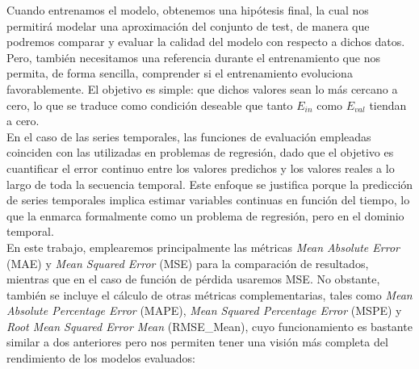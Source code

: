 Cuando entrenamos el modelo, obtenemos una hipótesis final, la cual nos permitirá modelar una aproximación del conjunto de test, de manera que podremos comparar y evaluar la calidad del modelo con respecto a dichos datos. Pero, también necesitamos una referencia durante el entrenamiento que nos permita, de forma sencilla, comprender si el entrenamiento evoluciona favorablemente. El objetivo es simple: que dichos valores sean lo más cercano a cero, lo que se traduce como condición deseable que tanto $E_{in}$ como $E_{val}$ tiendan a cero.\\

En el caso de las series temporales, las funciones de evaluación empleadas coinciden con las utilizadas en problemas de regresión, dado que el objetivo es cuantificar el error continuo entre los valores predichos y los valores reales a lo largo de toda la secuencia temporal. Este enfoque se justifica porque la predicción de series temporales implica estimar variables continuas en función del tiempo, lo que la enmarca formalmente como un problema de regresión, pero en el dominio temporal.\\

En este trabajo, emplearemos principalmente las métricas \textit{Mean Absolute Error} (MAE) y \textit{Mean Squared Error} (MSE) para la comparación de resultados,  mientras que en el caso de función de pérdida usaremos MSE. No obstante, también se incluye el cálculo de otras métricas complementarias, tales como \textit{Mean Absolute Percentage Error} (MAPE), \textit{Mean Squared Percentage Error} (MSPE) y \textit{Root Mean Squared Error Mean} (RMSE\_Mean), cuyo funcionamiento es bastante similar a dos anteriores pero nos permiten tener una visión más completa del rendimiento de los modelos evaluados:

